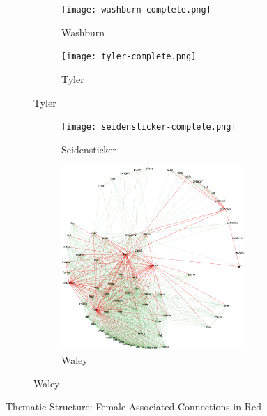 \documentclass[12pt]{article}
\begin{document}
\begin{flushleft}
\begin{spacing}{2.0}
\begin{figure}
	\begin{subfigure}{\linewidth}
		\begin{subfigure}{.5\linewidth}
	  		\texttt{[image: washburn-complete.png]}\hfill
	  		\caption{Washburn}
	  	\end{subfigure}
	  	\begin{subfigure}{.5\linewidth}
	  		\texttt{[image: tyler-complete.png]}
	  		\caption{Tyler}
	  	\end{subfigure}
	\end{subfigure}\par\medskip
	\begin{subfigure}{\linewidth}
		\begin{subfigure}{.5\linewidth}
			\texttt{[image: seidensticker-complete.png]}\hfill
			\caption{Seidensticker}
		\end{subfigure}
		\begin{subfigure}{.5\linewidth}
			\includegraphics[width=3in]{waley-complete.png}
			\caption{Waley}
		\end{subfigure}
	\end{subfigure}
	\caption{Thematic Structure: Female-Associated Connections in Red}
	\label{full-networks}
\end{figure}


\end{spacing}
\end{flushleft}
\end{document}
